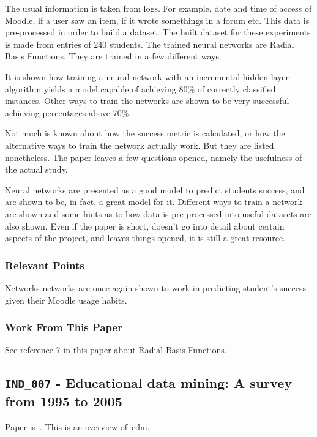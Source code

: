 The usual information is taken from logs. For example, date and time of access
of Moodle, if a user saw an item, if it wrote somethings in a forum etc. This
data is pre-processed in order to build a dataset. The built dataset for these
experiments is made from entries of 240 students. The trained neural networks
are Radial Basis Functions. They are trained in a few different ways.

It is shown how training a neural network with an incremental hidden layer
algorithm yields a model capable of achieving 80\% of correctly classified
instances. Other ways to train the networks are shown to be very successful
achieving percentages above 70\%.

Not much is known about how the success metric is calculated, or how the
alternative ways to train the network actually work. But they are listed
nonetheless. The paper leaves a few questions opened, namely the usefulness of
the actual study.

Neural networks are presented as a good model to predict students success, and
are shown to be, in fact, a great model for it. Different ways to train a
network are shown and some hints as to how data is pre-processed into useful
datasets are also shown. Even if the paper is short, doesn't go into detail
about certain aspects of the project, and leaves things opened, it is still a
great resource.

\subsubsection{Relevant Points}

Networks networks are once again shown to work in predicting student's success
given their Moodle usage habits.

\subsubsection{Work From This Paper}

See reference 7 in this paper about Radial Basis Functions.

\subsection{\texttt{IND\_007} - Educational data mining: A survey from 1995 to
2005}

Paper is~\cite{ind_007}. This is an overview of~\gls{edm}.

